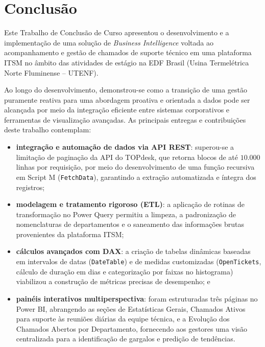 \chapter{Conclusão}

Este Trabalho de Conclusão de Curso apresentou o desenvolvimento e a implementação de uma solução de \textit{Business Intelligence} voltada ao acompanhamento e  gestão de chamados de suporte técnico em uma plataforma ITSM %
no âmbito das atividades de estágio na EDF Brasil (Usina Termelétrica Norte Fluminense -- UTENF). 


Ao longo do desenvolvimento, demonstrou-se como a transição de uma gestão puramente reativa para uma abordagem proativa e orientada a dados pode ser alcançada por meio da integração eficiente entre sistemas corporativos e ferramentas de visualização avançadas. As principais entregas e contribuições deste trabalho contemplam:

\begin{itemize}
	\item \textbf{integração e automação de dados via API REST}: superou-se a limitação de paginação da API do TOPdesk, que retorna blocos de até $10.000$ linhas por requisição, por meio do desenvolvimento de uma função recursiva em Script M (\texttt{FetchData}), garantindo a extração automatizada e íntegra dos registros;
	
	\item \textbf{modelagem e tratamento rigoroso (ETL)}: a aplicação de rotinas de transformação no Power Query permitiu a limpeza, a padronização de nomenclaturas de departamentos e o saneamento das informações brutas provenientes da plataforma ITSM;
	
	\item \textbf{cálculos avançados com DAX}: a criação de tabelas dinâmicas baseadas em intervalos de datas (\texttt{DateTable}) e de medidas customizadas (\texttt{OpenTickets}, cálculo de duração em dias e categorização por faixas no histograma) viabilizou a construção de métricas precisas de desempenho; e
	
	\item \textbf{painéis interativos multiperspectiva}: foram estruturadas três páginas no Power BI, abrangendo as seções de Estatísticas Gerais, Chamados Ativos para suporte às reuniões diárias da equipe técnica, e a Evolução dos Chamados Abertos por Departamento, fornecendo aos gestores uma visão centralizada para a identificação de gargalos e predição de tendências.
\end{itemize}

